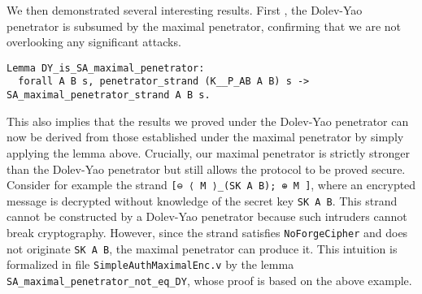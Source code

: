 We then demonstrated several interesting results.
First%
, the Dolev-Yao penetrator is subsumed by the maximal penetrator, confirming that we are not overlooking any significant attacks.
\begin{lstlisting}
Lemma DY_is_SA_maximal_penetrator:
  forall A B s, penetrator_strand (K__P_AB A B) s -> SA_maximal_penetrator_strand A B s.
\end{lstlisting}
This also implies that the results we proved under the Dolev-Yao penetrator can now be derived from those established under the maximal penetrator by simply applying the lemma above.
\ifdefined\COLORDIFF
    \color{cbred}
\else
\fi
Crucially, our maximal penetrator is strictly stronger than the Dolev-Yao penetrator but still allows the protocol to be proved secure.
Consider for example the strand \lstinline{[⊖ ⟨ M ⟩_(SK A B); ⊕ M ]}, where an encrypted message is decrypted without knowledge of the secret key \lstinline{SK A B}.
This strand cannot be constructed by a Dolev-Yao penetrator because such intruders cannot break cryptography.
However, since the strand satisfies \lstinline{NoForgeCipher} and does not originate \lstinline{SK A B}, the maximal penetrator can produce it.
This intuition is formalized in file \lstinline{SimpleAuthMaximalEnc.v} by the lemma \lstinline{SA_maximal_penetrator_not_eq_DY}, whose proof is based on the above example.
\ifdefined\COLORDIFF
    \color{black}
\else
\fi

